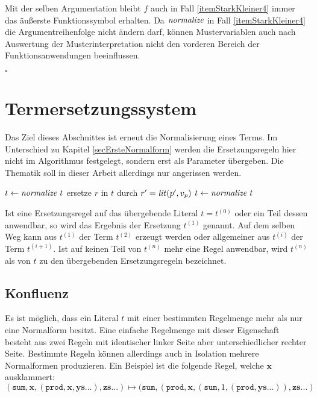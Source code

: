 Mit der selben Argumentation bleibt $f$ auch in Fall \ref{itemStarkKleiner4} immer das äußerste Funktionssymbol erhalten. 
Da $\mathit{normalize}$ in Fall \ref{itemStarkKleiner4} die Argumentreihenfolge nicht ändern darf, können Mustervariablen auch nach Auswertung der Musterinterpretation nicht den vorderen Bereich der Funktionsanwendungen beeinflussen.  

\hfill $\square$\\



\section{Termersetzungssystem} \label{subsecTermersetzungssystem}

Das Ziel dieses Abschnittes ist erneut die Normalisierung eines Terms. Im Unterschied zu Kapitel \ref{secErsteNormalform} werden die Ersetzungsregeln hier nicht im Algorithmus festgelegt, sondern erst als Parameter übergeben. Die Thematik soll in dieser Arbeit allerdings nur angerissen werden.

\begin{algorithm}
\DontPrintSemicolon
\caption{$\Const{applyRuleset} \colon \mathit{Regelmenge} \times T \rightarrow T$ }\label{algoTES}
$t \leftarrow \mathit{normalize}~t$\;
 {
    ersetze $r$ in $t$ durch $r' = \mathit{lit}(p', v_p)$\;
    $t \leftarrow \mathit{normalize}~t$\;
}
\end{algorithm}

Ist eine Ersetzungsregel auf das übergebende Literal $t = t^{(0)}$ oder ein Teil dessen anwendbar, so wird das Ergebnis der Ersetzung $t^{(1)}$ genannt. Auf dem selben Weg kann aus $t^{(1)}$ der Term $t^{(2)}$ erzeugt werden oder allgemeiner aus $t^{(i)}$ der Term $t^{(i+1)}$. Ist auf keinen Teil von $t^{(n)}$ mehr eine Regel anwendbar, wird $t^{(n)}$ als  von $t$ zu den übergebenden Ersetzungsregeln bezeichnet. 



\subsection {Konfluenz} \label{subsubsecKonfluenz}
Es ist möglich, dass ein Literal $t$ mit einer bestimmten Regelmenge mehr als nur eine Normalform besitzt. Eine einfache Regelmenge mit dieser Eigenschaft besteht aus zwei Regeln mit identischer linker Seite aber unterschiedlicher rechter Seite. Bestimmte Regeln können allerdings auch in Isolation mehrere Normalformen produzieren. Ein Beispiel ist die folgende Regel, welche $\mathbf x$ ausklammert:
$$(\texttt{sum}, \mathbf x, (\texttt{prod}, \mathbf x, \mathbf{ys...}), \mathbf{zs...}) 
\mapsto (\texttt{sum}, (\texttt{prod}, \mathbf x, (\texttt{sum}, 1, (\texttt{prod}, \mathbf{ys...})) , \mathbf{zs...})$$

